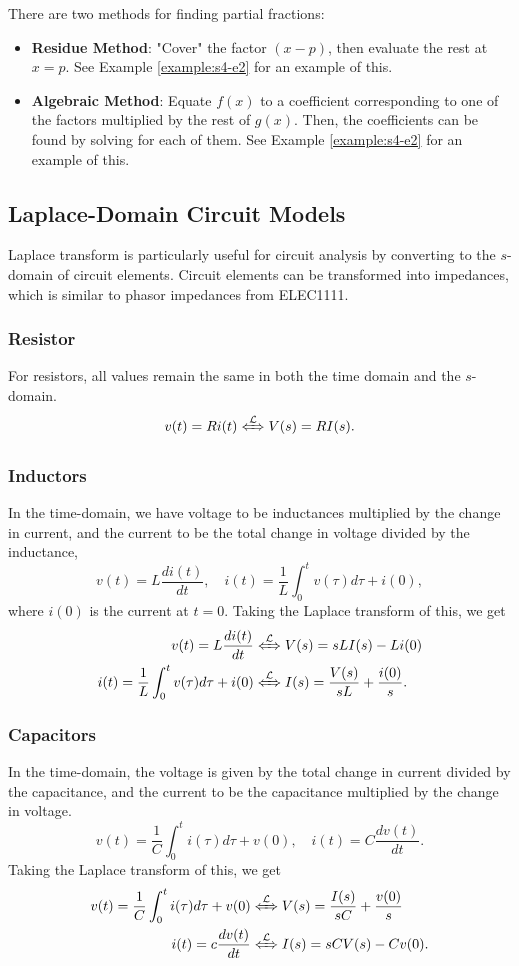 \documentclass{article}
\begin{document}
There are two methods for finding partial fractions:
\begin{itemize}
    \item \textbf{Residue Method}: "Cover" the factor $(x-p)$, then evaluate the rest at $x=p$. See Example \ref{example:s4-e2} for an example of this.
    \item \textbf{Algebraic Method}: Equate $f(x)$ to a coefficient corresponding to one of the factors multiplied by the rest of $g(x)$. Then, the coefficients can be found by solving for each of them. See Example \ref{example:s4-e2} for an example of this.
\end{itemize}

\subsection{Laplace-Domain Circuit Models}
Laplace transform is particularly useful for circuit analysis by converting to the $s$-domain of circuit elements. Circuit elements can be transformed into impedances, which is similar to phasor impedances from ELEC1111.

\subsubsection{Resistor}
For resistors, all values remain the same in both the time domain and the $s$-domain.
\[
    v(t)=Ri(t)\xLeftrightarrow{\mathcal{L}}V(s)=RI(s).
\]

\subsubsection{Inductors}
In the time-domain, we have voltage to be inductances multiplied by the change in current, and the current to be the total change in voltage divided by the inductance,
\[
    v(t)=L \frac{d i(t)}{d t},\quad i(t)=\frac{1}{L}\int_0^tv(\tau )d\tau +i(0),
\]
where $i(0)$ is the current at $t=0$. Taking the Laplace transform of this, we get
\begin{align*}
    v(t)=L \frac{d i(t)}{d t} &\xLeftrightarrow{\mathcal{L}} V(s)= sLI(s)-Li(0) \\
    i(t)=\frac{1}{L} \int_0^tv(\tau )d\tau +i(0) &\xLeftrightarrow{\mathcal{L}} I(s)=\frac{V(s)}{sL}+\frac{i(0)}{s}.
\end{align*}

\subsubsection{Capacitors}
In the time-domain, the voltage is given by the total change in current divided by the capacitance, and the current to be the capacitance multiplied by the change in voltage.
\[
    v(t)=\frac{1}{C}\int_0^ti(\tau )d\tau +v(0),\quad i(t)=C \frac{d v(t)}{d t}.
\]
Taking the Laplace transform of this, we get
\begin{align*}
    v(t)=\frac{1}{C}\int_0^ti(\tau )d\tau +v(0) &\xLeftrightarrow{\mathcal{L}}V(s)=\frac{I(s)}{sC}+\frac{v(0)}{s}  \\
    i(t)=c \frac{d v(t)}{d t} &\xLeftrightarrow{\mathcal{L}}I(s)=sCV(s)-Cv(0).
\end{align*}
\end{document}
